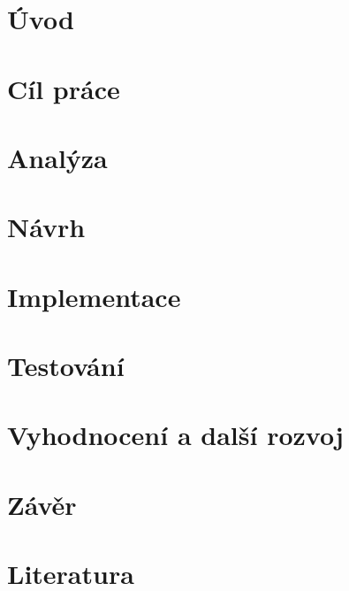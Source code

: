 \chapter*{Úvod}

\chapter{Cíl práce}

\setcounter{page}{1}


\chapter{Analýza}



\chapter{Návrh}


\chapter{Implementace}


\chapter{Testování}


\chapter{Vyhodnocení a další rozvoj}


\chapter*{Závěr}
\chapter*{Literatura}
